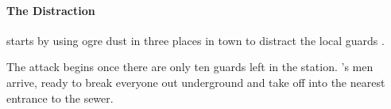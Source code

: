 \begin{multicols}{2}
\paragraph{The Distraction} starts by using ogre dust in three places in town to distract the local guards%
\iftoggle{aif}{(see \textit{Fenestra}, \autopageref{ogredust} for Ogre Dust)}{}.

The attack begins once there are only ten guards left in the station.
's men arrive, ready to break everyone out underground and take off into the nearest entrance to the sewer.

\stopcontents[sq]

\stopcontents[Villages]

\end{multicols}
